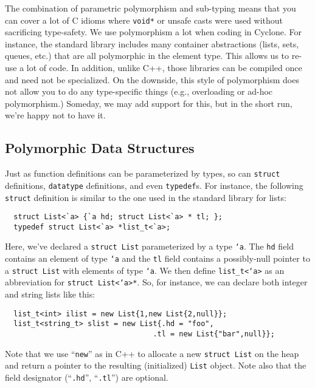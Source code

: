 The combination of parametric polymorphism and sub-typing means that
you can cover a lot of C idioms where \texttt{void*} or unsafe casts
were used without sacrificing type-safety.  We use polymorphism a lot
when coding in Cyclone.  For instance, the standard library includes
many container abstractions (lists, sets, queues, etc.) that are all
polymorphic in the element type.  This allows us to re-use a lot of
code.  In addition, unlike C++, those libraries can be compiled once
and need not be specialized.  On the downside, this style of
polymorphism does not allow you to do any type-specific things (e.g.,
overloading or ad-hoc polymorphism.)  Someday, we may add support for
this, but in the short run, we're happy not to have it.


\subsection{Polymorphic Data Structures}
\label{sec:polydat}

Just as function definitions can be parameterized by types, so can
\texttt{struct} definitions, \texttt{datatype} definitions, and even
\texttt{typedef}s.  For instance, the following \texttt{struct} definition
is similar to the one used in the standard library for lists:
\begin{verbatim}
  struct List<`a> {`a hd; struct List<`a> * tl; };
  typedef struct List<`a> *list_t<`a>;
\end{verbatim}

Here, we've declared a \texttt{struct List} parameterized by a type
\texttt{`a}.  The \texttt{hd} field contains an element of type \texttt{`a}
and the \texttt{tl} field contains a possibly-null pointer to a
\texttt{struct List} with elements of type \texttt{`a}.  We then define
\texttt{list_t<`a>} as an abbreviation for \texttt{struct List<`a>*}.  So,
for instance, we can declare both integer and string lists like this:
\begin{verbatim}
  list_t<int> ilist = new List{1,new List{2,null}};
  list_t<string_t> slist = new List{.hd = "foo",
                                  .tl = new List{"bar",null}};
\end{verbatim}

Note that we use ``\texttt{new}'' as in C++ to allocate a new
\texttt{struct List} on the heap and return a pointer to the resulting
(initialized) \texttt{List} object.  Note also that the field designator
(``\texttt{.hd}'', ``\texttt{.tl}'') are optional.

